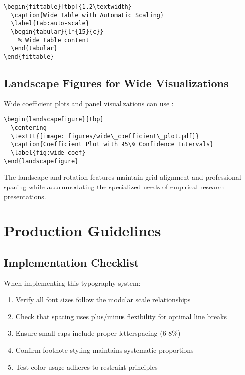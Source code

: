 \documentclass[11pt]{article}
\begin{document}
\begin{verbatim}
\begin{fittable}[tbp]{1.2\textwidth}
  \caption{Wide Table with Automatic Scaling}
  \label{tab:auto-scale}
  \begin{tabular}{l*{15}{c}}
    % Wide table content
  \end{tabular}
\end{fittable}
\end{verbatim}

\subsection{Landscape Figures for Wide Visualizations}

Wide coefficient plots and panel visualizations can use :

\begin{verbatim}
\begin{landscapefigure}[tbp]
  \centering
  \texttt{[image: figures/wide\_coefficient\_plot.pdf]}
  \caption{Coefficient Plot with 95\% Confidence Intervals}
  \label{fig:wide-coef}
\end{landscapefigure}
\end{verbatim}

The landscape and rotation features maintain grid alignment and professional spacing while accommodating the specialized needs of empirical research presentations.

\section{Production Guidelines}

\subsection{Implementation Checklist}

When implementing this typography system:

\begin{enumerate}
\item Verify all font sizes follow the modular scale relationships
\item Check that spacing uses plus/minus flexibility for optimal line breaks  
\item Ensure small caps include proper letterspacing (6-8\%)
\item Confirm footnote styling maintains systematic proportions
\item Test color usage adheres to restraint principles
\end{enumerate}
\end{document}

